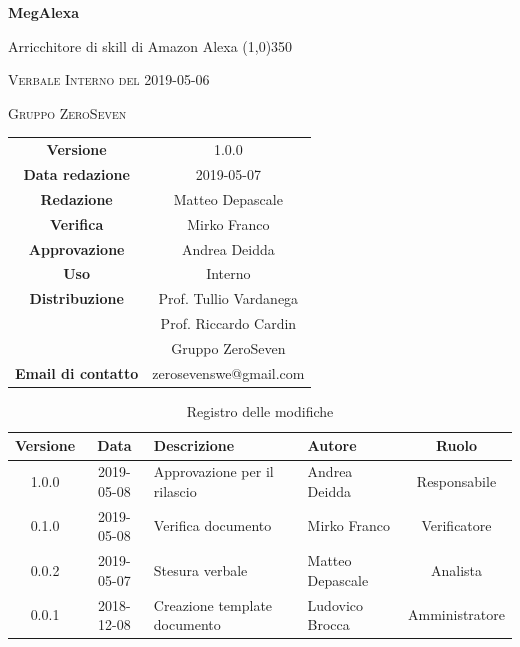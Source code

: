 \documentclass[a4paper,12pt]{article}
\author{Matteo Depascale}
\date{2019-05-07}
\begin{document}
	\begin{titlepage}
		\centering
		{\huge\bfseries MegAlexa\par}
		Arricchitore di skill di Amazon Alexa
		\line(1,0){350} \\
		{\scshape\LARGE Verbale Interno del 2019-05-06 \par}
		\vspace{1cm}
		{\scshape Gruppo ZeroSeven \par}
		\logo
		\begin{tabular}{c|c}
			{\hfill \textbf{Versione}} 			& 1.0.0				\\
			{\hfill\textbf{Data redazione}} 	& 2019-05-07\\ 
			{\hfill\textbf{Redazione}} 			&  Matteo Depascale	\\ 
			{\hfill\textbf{Verifica}} 				&  	  	Mirko Franco\\ 
			{\hfill\textbf{Approvazione}} 		&  Andrea Deidda\\ 
			{\hfill\textbf{Uso}} 					& 	Interno	\\ 
			{\hfill\textbf{Distribuzione}} 			& 			Prof. Tullio Vardanega \\ & Prof. Riccardo Cardin \\ & Gruppo ZeroSeven \\ 
			{\hfill\textbf{Email di contatto}} & zerosevenswe@gmail.com \\
		\end{tabular}
	\end{titlepage}
	
	
	
	\label{LastFrontPage}
	
	
	\newpage
	\cleardoublepage
	\begin{table}[tbph]
		\centering
		\begin{tabularx}{\textwidth}{|c|c|X|X|c|}
			\hline
			\textbf{Versione} & \textbf{Data} & \textbf{Descrizione} & \textbf{Autore} & \textbf{Ruolo} \\
			\hline
			1.0.0 & 2019-05-08 & Approvazione per il rilascio &Andrea Deidda & Responsabile \\
			\hline
			0.1.0 & 2019-05-08 & Verifica documento & Mirko Franco & Verificatore \\
			\hline
			0.0.2 & 2019-05-07 & Stesura verbale &Matteo Depascale & Analista \\
			\hline
			0.0.1 & 2018-12-08 & Creazione template documento & Ludovico Brocca & Amministratore\\
			\hline
		\end{tabularx}
		\caption{Registro delle modifiche}
	\end{table}
	\cleardoublepage
	\pagestyle{mymain}
	
\end{document}
